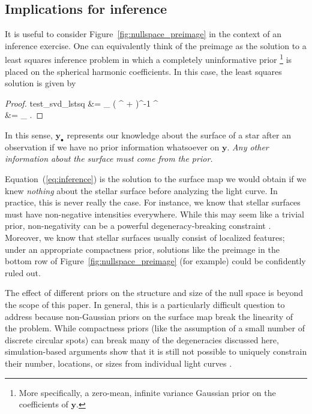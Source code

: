 \documentclass[modern]{aastex62}
\begin{document}
\subsection{Implications for inference}
%
It is useful to consider Figure~\ref{fig:nullspace_preimage} in the
context of an inference exercise. One can equivalently think of
the preimage as the solution to a least squares inference problem
in which a completely uninformative prior%
\footnote{%
    More specifically, a zero-mean, infinite variance Gaussian prior on the coefficients of $\mathbf{y}$.
}
is placed on the spherical harmonic
coefficients. In this case, the least squares solution is given by
%
\begin{proof}{test_svd_lstsq}
    \label{eq:inference}
    &=
    \lim_{\lambda {}} \left( ^\top {} + \lambda {}\right)^{-1} ^\top {}
    \nonumber\\
    &= _\bullet
    \quad.
\end{proof}
%
In this sense, $\mathbf{y}_\bullet$ represents our knowledge about the
surface of a star after an observation if we have no prior information
whatsoever on $\mathbf{y}$.
\emph{Any other information about the surface must come from the prior.}%

Equation~(\ref{eq:inference}) is the solution to the surface map
we would obtain if we knew \emph{nothing} about the stellar surface
before analyzing the light curve. In practice, this is never really
the case. For instance, we know that stellar surfaces
must have non-negative intensities everywhere. While this may seem
like a trivial prior, non-negativity can be a powerful degeneracy-breaking
constraint \citep[e.g.,][]{Fienup1982}. Moreover, we know that
stellar surfaces usually consist of localized features; under an
appropriate compactness prior, solutions
like the preimage in the bottom row of
Figure~\ref{fig:nullspace_preimage} (for example) could be
confidently ruled out.

The effect of different priors on the structure and size of the null
space is beyond the scope of this paper. In general, this is a particularly
difficult question to address because non-Gaussian priors on the
surface map break the linearity of the problem. While compactness priors
(like the assumption of a small number of discrete circular spots) can
break many of the degeneracies discussed here, simulation-based
arguments show that it is still not possible to uniquely constrain
their number, locations, or sizes from individual light curves
\citep{Basri2020}.
\end{document}

